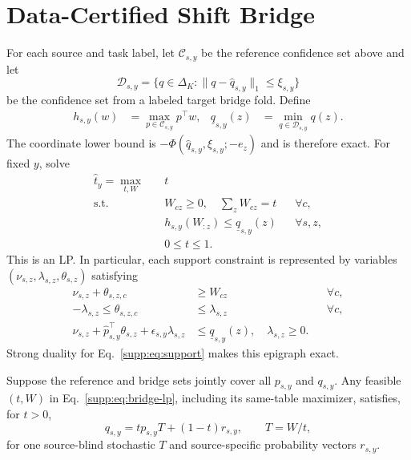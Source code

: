 \section{Data-Certified Shift Bridge}

For each source and task label, let
$\mathcal C_{s,y}$ be the reference confidence set above and let
\begin{equation}
 \mathcal D_{s,y}=\{q\in\Delta_K:
 \|q-\widehat q_{s,y}\|_1\leq\xi_{s,y}\}
 \label{supp:eq:bridge-set}
\end{equation}
be the confidence set from a labeled target bridge fold. Define
\begin{align}
 h_{s,y}(w)&=\max_{p\in\mathcal C_{s,y}}p^\top w,
 &\underline q_{s,y}(z)&=\min_{q\in\mathcal D_{s,y}}q(z).
 \label{supp:eq:bridge-support}
\end{align}
The coordinate lower bound is
$-\Phi(\widehat q_{s,y},\xi_{s,y};-e_z)$ and is therefore exact. For fixed
$y$, solve
\begin{equation}
 \begin{aligned}
 \widehat t_y=\max_{t,W}\quad&t\\
 \mathrm{s.t.}\quad&W_{cz}\geq0,\quad
 \sum_zW_{cz}=t &&\forall c,\\
 &h_{s,y}(W_{:z})\leq\underline q_{s,y}(z)
 &&\forall s,z,\\
 &0\leq t\leq1.
 \end{aligned}
 \label{supp:eq:bridge-lp}
\end{equation}
This is an LP. In particular, each support constraint is represented by
variables $(\nu_{s,z},\lambda_{s,z},\theta_{s,z})$ satisfying
\begin{align}
 \nu_{s,z}+\theta_{s,z,c}&\geq W_{cz} &&\forall c,\nonumber\\
 -\lambda_{s,z}\leq\theta_{s,z,c}&\leq\lambda_{s,z} &&\forall c,\nonumber\\
 \nu_{s,z}+\widehat p_{s,y}^{\top}\theta_{s,z}
 +\epsilon_{s,y}\lambda_{s,z}
 &\leq\underline q_{s,y}(z),\quad \lambda_{s,z}\geq0.
 \label{supp:eq:bridge-dual}
\end{align}
Strong duality for Eq.~\eqref{supp:eq:support} makes this epigraph exact.

\begin{theorem}
Suppose the reference and bridge sets jointly cover all $p_{s,y}$ and
$q_{s,y}$. Any feasible $(t,W)$ in Eq.~\eqref{supp:eq:bridge-lp}, including its
same-table maximizer, satisfies, for $t>0$,
\begin{equation}
 q_{s,y}=t p_{s,y}T+(1-t)r_{s,y},\qquad T=W/t,
 \label{supp:eq:bridge-membership}
\end{equation}
for one source-blind stochastic $T$ and source-specific probability vectors
$r_{s,y}$.
\end{theorem}

